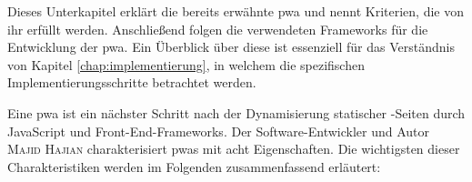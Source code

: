
Dieses Unterkapitel erklärt die bereits erwähnte \acf{pwa} und nennt Kriterien, die von ihr erfüllt werden. Anschließend folgen die verwendeten Frameworks für die Entwicklung der \ac{pwa}. Ein Überblick über diese ist essenziell für das Verständnis von Kapitel \ref{chap:implementierung}, in welchem die spezifischen Implementierungsschritte betrachtet werden.

Eine \acf{pwa} ist ein nächster Schritt nach der Dynamisierung statischer -Seiten durch JavaScript und Front-End-Frameworks. Der Software-Entwickler und Autor \textsc{Majid Hajian} charakterisiert \ac{pwa}s mit acht Eigenschaften. Die wichtigsten dieser Charakteristiken werden im Folgenden zusammenfassend erläutert:

